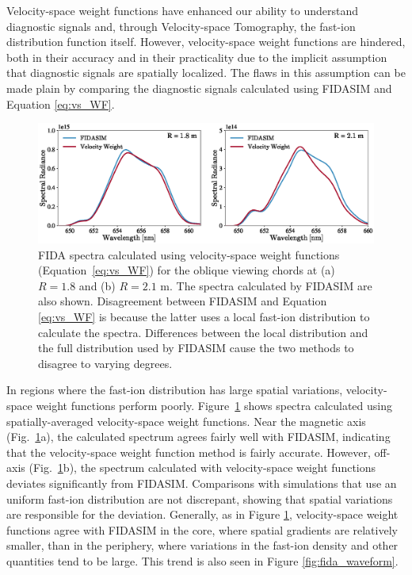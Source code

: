 Velocity-space weight functions have enhanced our ability to understand diagnostic signals and, through Velocity-space Tomography, the fast-ion distribution function itself. However, velocity-space weight functions are hindered, both in their accuracy and in their practicality due to the implicit assumption that diagnostic signals are spatially localized. The flaws in this assumption can be made plain by comparing the diagnostic signals calculated using FIDASIM and Equation \ref{eq:vs_WF}.
\begin{figure}[h!]
    \centering
    \includegraphics[width=15cm]{figures/fida_spectra.eps}
    \caption{FIDA spectra calculated using velocity-space weight functions 
(Equation~\ref{eq:vs_WF}) for the oblique viewing chords at
(a) $R = 1.8$ and (b) $R = 2.1$ m.  The spectra calculated by FIDASIM are also shown.
 Disagreement between FIDASIM and Equation \ref{eq:vs_WF} is because the latter uses a local fast-ion distribution to calculate the spectra. Differences between the local distribution and the full distribution used by FIDASIM cause the two methods to disagree to varying degrees.}
    \label{fig:fida_spectra}
\end{figure}
In regions where the fast-ion distribution has large spatial variations, velocity-space weight functions perform poorly.
Figure~\ref{fig:fida_spectra} shows spectra calculated using spatially-averaged velocity-space
weight functions.  Near the magnetic axis (Fig.~\ref{fig:fida_spectra}a), the calculated
spectrum agrees fairly well with FIDASIM, indicating that the velocity-space weight function method is fairly accurate. However,
off-axis (Fig.~\ref{fig:fida_spectra}b), the spectrum calculated with
velocity-space weight functions deviates significantly from FIDASIM.  Comparisons with simulations that use an uniform fast-ion distribution are not discrepant, showing that spatial variations are responsible for the deviation.
Generally, as in Figure \ref{fig:fida_spectra}, velocity-space weight functions agree with FIDASIM in the core, where spatial gradients are relatively smaller, than in the periphery, where variations in the fast-ion density and other quantities tend to be large.
This trend is also seen in Figure \ref{fig:fida_waveform}.

